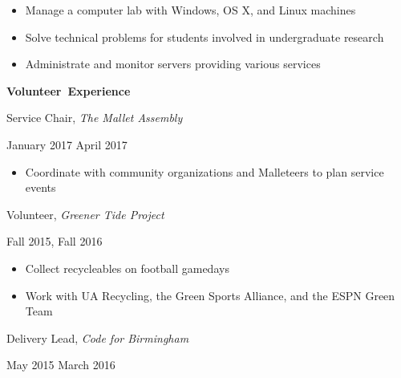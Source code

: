 \documentclass[11pt]{article}
\begin{document}
\begin{itemize}
  \item Manage a computer lab with Windows, OS X, and Linux machines
  \item Solve technical problems for students involved in undergraduate research
  \item Administrate and monitor servers providing various services
\end{itemize}

\vspace{0.8em}
\hbox{\large \textbf{Volunteer Experience}}

\vspace{0.4em}
\begin{minipage}[t]{0.65\textwidth}
\flushleft
Service Chair, \textit{The Mallet Assembly}\\
\end{minipage}
\begin{minipage}[t]{0.30\textwidth}
\flushright
January 2017 \space \textemdash \space April 2017\\
\end{minipage}

\begin{itemize}
  \item Coordinate with community organizations and Malleteers to plan service events
\end{itemize}

\vspace{0.4em}
\begin{minipage}[t]{0.65\textwidth}
\flushleft
Volunteer, \textit{Greener Tide Project}\\
\end{minipage}
\begin{minipage}[t]{0.30\textwidth}
\flushright
Fall 2015, Fall 2016\\
\end{minipage}

\begin{itemize}
  \item Collect recycleables on football gamedays
  \item Work with UA Recycling, the Green Sports Alliance, and the ESPN Green Team
\end{itemize}

\vspace{0.4em}
\begin{minipage}[t]{0.65\textwidth}
\flushleft
Delivery Lead, \textit{Code for Birmingham}\\
\end{minipage}
\begin{minipage}[t]{0.30\textwidth}
\flushright
May 2015 \space \textemdash \space March 2016\\
\end{minipage}
\end{document}

